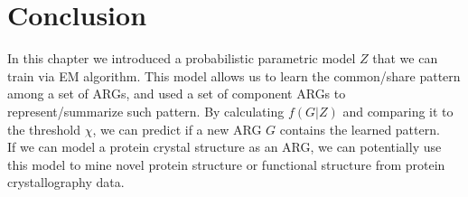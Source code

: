 \section{Conclusion}

In this chapter we introduced a probabilistic parametric model $Z$ that we can train via EM algorithm. This model allows us to learn the common/share pattern among a set of ARGs, and used a set of component ARGs to represent/summarize such pattern. By calculating $f(G|Z)$ and comparing it to the threshold $\chi$, we can predict if a new ARG $G$ contains the learned pattern.\\

If we can model a protein crystal structure as an ARG, we can potentially use this model to mine novel protein structure or functional structure from protein crystallography data.







